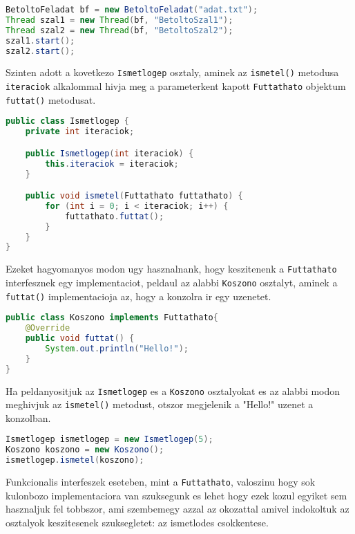 \documentclass{article}
\let\l\lstinline
\begin{document}
    \begin{lstlisting}[language=Java, caption=Uj szalak inditasa ugyanazzal a Runnable objektummal]
BetoltoFeladat bf = new BetoltoFeladat("adat.txt");
Thread szal1 = new Thread(bf, "BetoltoSzal1");
Thread szal2 = new Thread(bf, "BetoltoSzal2");
szal1.start();
szal2.start();
    \end{lstlisting}


    Szinten adott a kovetkezo \l{Ismetlogep} osztaly, aminek az \l{ismetel()} metodusa \l{iteraciok} alkalommal hivja meg a parameterkent kapott \l{Futtathato} objektum \l{futtat()} metodusat.

    \begin{lstlisting}[language=Java, caption=Ismetlogep osztaly]
public class Ismetlogep {
	private int iteraciok;

	public Ismetlogep(int iteraciok) {
		this.iteraciok = iteraciok;
	}

	public void ismetel(Futtathato futtathato) {
		for (int i = 0; i < iteraciok; i++) {
			futtathato.futtat();
		}
	}
}
    \end{lstlisting}

    Ezeket hagyomanyos modon ugy hasznalnank, hogy keszitenenk a \l{Futtathato} interfesznek egy implementaciot, peldaul az alabbi \l{Koszono} osztalyt, aminek a \l{futtat()} implementacioja az, hogy a konzolra ir egy uzenetet.

    \begin{lstlisting}[language=Java, caption=Koszono osztaly]
public class Koszono implements Futtathato{
    @Override
    public void futtat() {
        System.out.println("Hello!");
    }
}
    \end{lstlisting}

    Ha peldanyositjuk az \l{Ismetlogep} es a \l{Koszono} osztalyokat es az alabbi modon meghivjuk az \l{ismetel()} metodust, otszor megjelenik a "Hello!" uzenet a konzolban.

    \begin{lstlisting}[language=Java, caption=Koszono osztaly es Ismetlogep hasznalata]
Ismetlogep ismetlogep = new Ismetlogep(5);
Koszono koszono = new Koszono();
ismetlogep.ismetel(koszono);
    \end{lstlisting}

    Funkcionalis interfeszek eseteben, mint a \l{Futtathato}, valoszinu hogy sok kulonbozo implementaciora van szuksegunk es lehet hogy ezek kozul egyiket sem hasznaljuk fel tobbszor, ami szembemegy azzal az okozattal amivel indokoltuk az osztalyok keszitesenek szuksegletet: az ismetlodes csokkentese.
\end{document}
